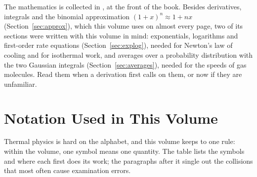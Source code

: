 The mathematics is collected in , at the front of the book. Besides
derivatives, integrals and the binomial approximation $(1+x)^n\approx1+nx$ (Section~\ref{sec:approx}),
which this volume uses on almost every page, two of its sections were written with this volume in mind:
exponentials, logarithms and first-order rate equations (Section~\ref{sec:explog}), needed for Newton's law
of cooling and for isothermal work, and averages over a probability distribution with the two Gaussian
integrals (Section~\ref{sec:averages}), needed for the speeds of gas molecules. Read them when a derivation
first calls on them, or now if they are unfamiliar.

\clearpage
\section*{Notation Used in This Volume}

Thermal physics is hard on the alphabet, and this volume keeps to one rule: within the volume, one symbol
means one quantity. The table lists the symbols and where each first does its work; the paragraphs after
it single out the collisions that most often cause examination errors.

